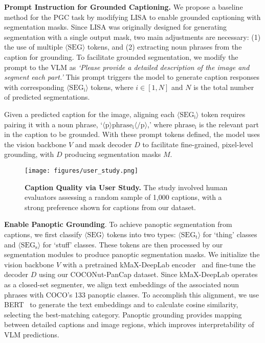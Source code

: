 \noindent\textbf{Prompt Instruction for Grounded Captioning.} We propose a baseline method for the PGC task by modifying LISA to enable grounded captioning with segmentation masks. Since LISA was originally designed for generating segmentation with a single output mask, two main adjustments are necessary: (1) the use of multiple $\langle \mathrm{SEG} \rangle$ tokens, and (2) extracting noun phrases from the caption for grounding.
To facilitate grounded segmentation, we modify the prompt to the VLM as \textit{`Please provide a detailed description of the image and segment each part.'} This prompt triggers the model to generate caption responses with corresponding $\langle \mathrm{SEG_i} \rangle$ tokens, where $i \in [1,N]$ and $N$ is the total number of predicted segmentations. 

Given a predicted caption for the image, aligning each $\langle \mathrm{SEG_i} \rangle$ token requires pairing it with a noun phrase, `$\langle \mathrm{p} \rangle \mathrm{phrase_i} \langle \mathrm{/p} \rangle$,' where $\mathrm{phrase_i}$ is the relevant part in the caption to be grounded.
With these prompt tokens defined, the model uses the vision backbone $V$ and mask decoder $D$ to facilitate fine-grained, pixel-level grounding, with $D$ producing segmentation masks $M$. 

\begin{figure}[t!]
    \centering
    \texttt{[image: figures/user\_study.png]}
    \caption{\textbf{Caption Quality via User Study.} The study involved human evaluators assessing a random sample of 1,000 captions, with a strong preference shown for captions from our dataset. }
    \label{fig:user_study}
\end{figure}


\noindent\textbf{Enable Panoptic Grounding}. To achieve panoptic segmentation from captions, we first classify $\langle \mathrm{SEG} \rangle$ tokens into two types: $\langle \mathrm{SEG_t} \rangle$ for `thing' classes and $\langle \mathrm{SEG_s} \rangle$ for `stuff' classes. These tokens are then processed by our segmentation modules to produce panoptic segmentation masks.
We initialize the vision backbone $V$ with a pretrained kMaX-DeepLab encoder~\cite{yu2022kmaxdeeplab} and fine-tune the decoder $D$ using our COCONut-PanCap dataset. Since kMaX-DeepLab operates as a closed-set segmenter, we align text embeddings of the associated noun phrases with COCO’s 133 panoptic classes. To accomplish this alignment, we use BERT~\cite{koroteev2021bert} to generate the text embeddings and to calculate cosine similarity, selecting the best-matching category.
Panoptic grounding provides mapping between detailed captions and image regions, which  improves interpretability of VLM predictions.



